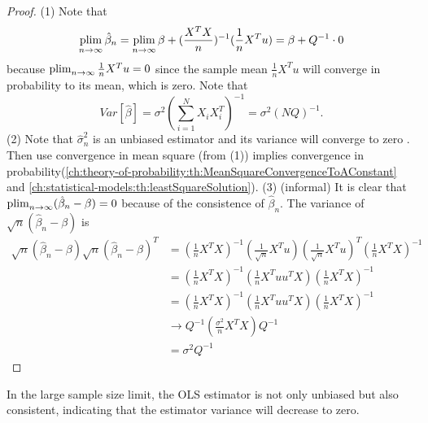 \begin{refsection}
\begin{theorem}
\begin{itemize}
\end{itemize}
\end{theorem}
\begin{proof}
(1)
Note that
$$\operatorname*{plim}_{n\to \infty} \hat{\beta}_n = \operatorname*{plim}_{n\to \infty}\beta + (\frac{X^TX}{n})^{-1}(\frac{1}{n}X^Tu) = \beta + Q^{-1}\cdot 0$$
because $\operatorname*{plim}_{n\to \infty} \frac{1}{n}X^Tu = 0$ since the sample mean $\frac{1}{n}X^Tu$ will converge in probability to its mean, which is zero.
Note that
$$Var[\hat{\beta}] = \sigma^2 (\sum_{i=1}^N X_iX_i^T)^{-1} = \sigma^2(NQ)^{-1}.$$
(2) Note that $\hat{\sigma}^2_n$ is an unbiased estimator and its variance will converge to zero . Then use convergence in mean square (from (1)) implies convergence in probability(\autoref{ch:theory-of-probability:th:MeanSquareConvergenceToAConstant} and \autoref{ch:statistical-models:th:leastSquareSolution}).
(3) (informal) It is clear that $\operatorname*{plim}_{n\to\infty} (\hat{\beta}_n - \beta) = 0$ because of the consistence of $\hat{\beta}_n$. 
The variance of $\sqrt{n}(\hat{\beta}_n - \beta)$ is
\begin{align*}
\sqrt{n}(\hat{\beta}_n - \beta)\sqrt{n}(\hat{\beta}_n - \beta)^T &= (\frac{1}{n}X^TX)^{-1}(\frac{1}{\sqrt{n}}X^Tu)(\frac{1}{\sqrt{n}}X^Tu)^T(\frac{1}{n}X^TX)^{-1} \\
&= (\frac{1}{n}X^TX)^{-1}(\frac{1}{n}X^Tuu^TX)(\frac{1}{n}X^TX)^{-1} \\
&= (\frac{1}{n}X^TX)^{-1}(\frac{1}{n}X^Tuu^TX)(\frac{1}{n}X^TX)^{-1} \\  
&\to Q^{-1}(\frac{\sigma^2}{n}X^TX)Q^{-1} \\
&= \sigma^2Q^{-1} 
\end{align*}	
\end{proof}


\begin{remark}[interpretation]
In the large sample size limit, the OLS estimator is not only unbiased but also consistent, indicating that the estimator variance will decrease to zero.	
\end{remark}


\end{refsection}
